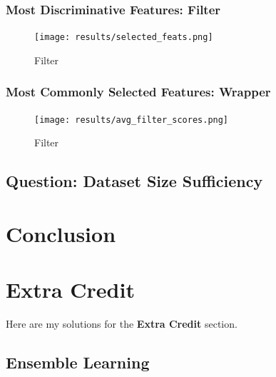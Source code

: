 \documentclass[12pt,twoside,a4paper]{article}
\begin{document}
\subsubsection*{Most Discriminative Features: Filter}

\begin{figure}[H]
    \centering
    \texttt{[image: results/selected\_feats.png]}
    \caption{Filter}
    \label{fig: FW6}
\end{figure}

\subsubsection*{Most Commonly Selected Features: Wrapper}

\begin{figure}[H]
    \centering
    \texttt{[image: results/avg\_filter\_scores.png]}
    \caption{Filter}
    \label{fig: FW7}
\end{figure}

\subsection{Question: Dataset Size Sufficiency}

\section{Conclusion}

\section{Extra Credit}
Here are my solutions for the \textbf{Extra Credit} section.
\subsection{Ensemble Learning}

{\small

}
\end{document}

